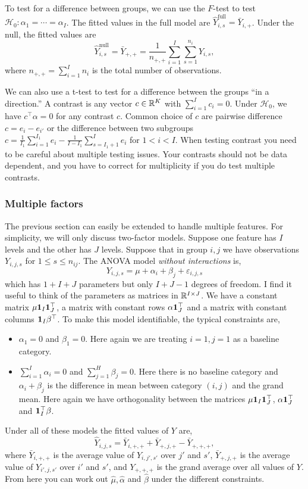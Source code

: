 To test for a difference between groups, we can use the $F$-test to test $\mathcal{H}_0 : \alpha_1 = \cdots = \alpha_I$. The fitted values in the full model are $\hat{Y}_{i,s}^{\text{full}} = \bar{Y}_{i,+}$. Under the null, the fitted values are 
\[\hat{Y}_{i,s}^{\text{null}} = \bar{Y}_{+,+} = \frac{1}{n_{+,+}} \sum_{i=1}^I \sum_{s=1}^{n_i} Y_{i,s},\] 
where $n_{+,+} = \sum_{i=1}^I n_{i}$ is the total number of observations. 

We can also use a t-test to test for a difference between the groups ``in a direction.'' A contrast is any vector $c \in \mathbb{R}^K$ with $\sum_{i=1}^I c_i = 0$. Under $\mathcal{H}_0$, we have $c^\top \alpha =0$ for any contrast $c$. Common choice of $c$ are pairwise difference $c= e_i-e_{i'}$ or the difference between two subgroups $c = \frac{1}{I_1}\sum_{i=1}^{I_1}e_i - \frac{1}{I-I_1}\sum_{s=I_1+1}^I e_i$ for $1 < i < I$. When testing contrast you need to be careful about multiple testing issues. Your contrasts should not be data dependent, and you have to correct for multiplicity if you do test multiple contrasts.

\subsubsection*{Multiple factors}

The previous section can easily be extended to handle multiple features. For simplicity, we will only discuss two-factor models. Suppose one feature has $I$ levels and the other has $J$ levels. Suppose that in group $i,j$ we have observations $Y_{i,j,s}$ for $1\le s \le n_{ij}$. The ANOVA model \emph{without interactions} is,
\begin{equation}
    \label{ANOVA2} Y_{i,j,s} = \mu + \alpha_i + \beta_j + \varepsilon_{i,j,s}
\end{equation}
which has $1 + I + J$ parameters but only $I+J-1$ degrees of freedom. I find it useful to think of the parameters as matrices in $\mathbb{R}^{I\times J}$. We have a constant matrix $\mu \mathbf 1_I \mathbf 1_J^\top $, a matrix with constant rows $\alpha \mathbf 1_{J}^\top$ and a matrix with constant columns $\mathbf 1_I \beta^\top$. 
To make this model identifiable, the typical constraints are,
\begin{itemize}
    \item $\alpha_1 = 0$ and $\beta_1 = 0$. Here again we are treating $i=1, j=1$ as a baseline category.
    \item $\sum_{i=1}^I \alpha_i = 0$ and $\sum_{j=1}^H \beta_j = 0$. Here there is no baseline category and $\alpha_i + \beta_j$ is the difference in mean between category $(i,j)$  and the grand mean. Here again we have orthogonality between the matrices $\mu \mathbf 1_I \mathbf 1_J^\top $, $\alpha \mathbf 1_{J}^\top$ and $\mathbf 1_I^\top \beta$.
\end{itemize}
Under all of these models the fitted values of $Y$ are,
\[\hat{Y}_{i,j,s} = \bar{Y}_{i,+,+}+\bar{Y}_{+,j,+} - \bar{Y}_{+,+,+}, \] 
where $\bar{Y}_{i,+,+}$ is the average value of $Y_{i,j',s'}$ over $j'$ and $s'$, $\bar{Y}_{+,j,+}$ is the average value of $Y_{i',j,s'}$ over $i'$ and $s'$, and $Y_{+,+,+}$ is the grand average over all values of $Y$. From here you can work out $\hat{\mu},\hat{\alpha}$ and $\hat{\beta}$ under the different constraints.

